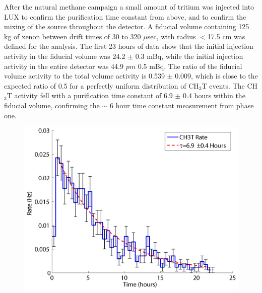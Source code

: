 \documentclass[a4paper,12pt]{article}
\begin{document}
{After the natural methane campaign a small amount of tritium was injected into LUX to confirm the purification time constant from above, and to confirm the mixing of the source throughout the detector.  A fiducial volume containing 125 kg of xenon between drift times of 30 to 320 $\mu$sec, with radius $ < $17.5 cm was defined for the analysis.  The first 23 hours of data show that the initial injection activity in the fiducial volume was 24.2 $\pm$ 0.3 mBq, while the initial injection activity in the entire detector was 44.9 $pm$ 0.5 mBq.  The ratio of the fiducial volume activity to the total volume activity is 0.539 $\pm$ 0.009, which is close to the expected ratio of 0.5 for a perfectly uniform distribution of CH$_3$T events. The CH$_3$T activity fell with a purification time constant of 6.9 $\pm$ 0.4 hours within the fiducial volume, confirming the $\sim$ 6 hour time constant measurement from phase one.

\begin{figure} [!h]
\includegraphics[scale=.7]{CH3T_fid_rate_new.png} 
\label{LUXPurificationRate}
\end{figure}

}
\end{document}
